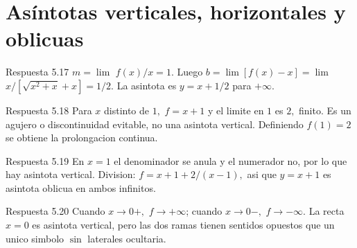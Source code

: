 \documentclass[10pt,a4paper,oneside,openany]{book}
\begin{document}
\section{Asíntotas verticales, horizontales y oblicuas}
\begin{PSevenAnswerFixed}{Respuesta 5.17}
\(m=\lim\) \(f(x)/x=1\). Luego \(b=\lim[f(x)-x]=\lim\) \(x/[\sqrt{x^{2}+x}+x]=1/2\). La asintota es \(y=x+1/2\) para \(+\infty \).
\end{PSevenAnswerFixed}
\begin{PSevenAnswerFixed}{Respuesta 5.18}
Para \(x\) distinto de \(1,\) \(f=x+1\) y el limite en \(1\) es \(2,\) finito. Es un agujero o discontinuidad evitable, no una asintota vertical. Definiendo \(f(1)=2\) se obtiene la prolongacion continua.
\end{PSevenAnswerFixed}
\begin{PSevenAnswerFixed}{Respuesta 5.19}
En \(x=1\) el denominador se anula y el numerador no, por lo que hay asintota vertical. Division: \(f=x+1+2/(x-1),\) asi que \(y=x+1\) es asintota oblicua en ambos infinitos.
\end{PSevenAnswerFixed}
\begin{PSevenAnswerFixed}{Respuesta 5.20}
Cuando \(x\to 0+,\) \(f\to +\infty \); cuando \(x\to 0-,\) \(f\to -\infty \). La recta \(x=0\) es asintota vertical, pero las dos ramas tienen sentidos opuestos que un unico simbolo \(\sin\) laterales ocultaria.
\end{PSevenAnswerFixed}
\end{document}
